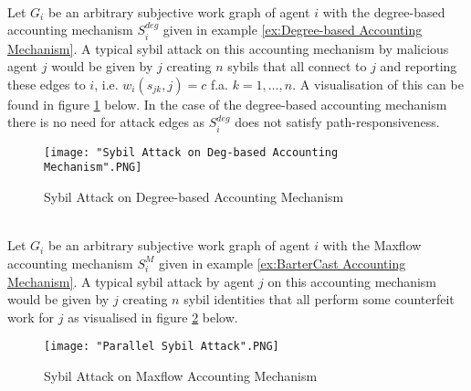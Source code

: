 \begin{example}[]\ \\
\label{ex:Sybil Attack on Degree Accounting Mechanism}
\noindent{}Let $G_i$ be an arbitrary subjective work graph of agent $i$ with the degree-based accounting mechanism $S^{deg}_i$ given in example \ref{ex:Degree-based Accounting Mechanism}. A typical sybil attack on this accounting mechanism by malicious agent $j$ would be given by $j$ creating $n$ sybils that all connect to $j$ and reporting these edges to $i$, i.e. $w_i(s_{jk},j)=c$ f.a. $k=1,\ldots,n$. A visualisation of this can be found in figure \ref{fig:Sybil Attack on Degree-based Accounting Mechanism} below. In the case of the degree-based accounting mechanism there is no need for attack edges as $S^{deg}_i$ does not satisfy path-responsiveness.\vspace{1em}\\

\begin{figure}[H]
\begin{center}
\texttt{[image: "Sybil Attack on Deg-based Accounting Mechanism".PNG]}
\caption{Sybil Attack on Degree-based Accounting Mechanism}
\label{fig:Sybil Attack on Degree-based Accounting Mechanism}
\end{center}
\end{figure}
\end{example}


\begin{example}[]\ \\
\label{ex:Sybil Attack on Maxflow}
\noindent{}Let $G_i$ be an arbitrary subjective work graph of agent $i$ with the Maxflow accounting mechanism $S^M_i$ given in example \ref{ex:BarterCast Accounting Mechanism}. A typical sybil attack by agent $j$ on this accounting mechanism would be given by $j$ creating $n$ sybil identities that all perform some counterfeit work for $j$ as visualised in figure \ref{fig:Sybil Attack on Maxflow Accounting Mechanism} below.\vspace{1em}\\
\begin{figure}[H]
\begin{center}
\texttt{[image: "Parallel Sybil Attack".PNG]}
\caption{Sybil Attack on Maxflow Accounting Mechanism}
\label{fig:Sybil Attack on Maxflow Accounting Mechanism}
\end{center}
\end{figure}
\end{example}


